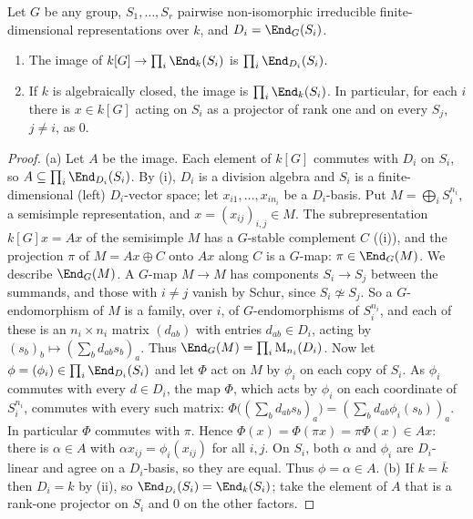 \begin{theorem}\label{thm:reps:burnside}
Let $G$ be any group, $S_1,\dots,S_r$ pairwise non-isomorphic irreducible finite-dimensional representations over $k$, and
$D_i=\End_G(S_i)$.
\begin{enumerate}[label=(\alph*)]
\item The image of $k[G]\to\prod_i\End_k(S_i)$ is $\prod_i\End_{D_i}(S_i)$.
\item If $k$ is algebraically closed, the image is $\prod_i\End_k(S_i)$. In particular, for each $i$ there is $x\in k[G]$ acting on $S_i$ as a
projector of rank one and on every $S_j$, $j\ne i$, as $0$.
\end{enumerate}
\end{theorem}

\begin{proof}
(a) Let $A$ be the image. Each element of $k[G]$ commutes with $D_i$ on $S_i$, so $A\subseteq\prod_i\End_{D_i}(S_i)$. By (i), $D_i$ is a
division algebra and $S_i$ is a finite-dimensional (left) $D_i$-vector space; let $x_{i1},\dots,x_{in_i}$ be a $D_i$-basis. Put
$M=\bigoplus_iS_i^{n_i}$, a semisimple representation, and $x=(x_{ij})_{i,j}\in M$. The subrepresentation $k[G]x=Ax$ of the semisimple $M$ has a $G$-stable complement $C$
((i)), and the projection $\pi$ of $M=Ax\oplus C$ onto $Ax$ along $C$ is a $G$-map: $\pi\in\End_G(M)$. We describe $\End_G(M)$. A
$G$-map $M\to M$ has components $S_i\to S_j$ between the summands, and those with $i\ne j$ vanish by Schur, since $S_i\not\simeq S_j$. So a
$G$-endomorphism of $M$ is a family, over $i$, of $G$-endomorphisms of $S_i^{n_i}$, and each of these is an $n_i\times n_i$ matrix $(d_{ab})$ with
entries $d_{ab}\in D_i$, acting by $(s_b)_b\mapsto(\sum_bd_{ab}s_b)_a$. Thus $\End_G(M)=\prod_i\mathrm M_{n_i}(D_i)$. Now let $\phi=(\phi_i)\in\prod_i\End_{D_i}(S_i)$ and let $\Phi$ act on
$M$ by $\phi_i$ on each copy of $S_i$. As $\phi_i$ commutes with every $d\in D_i$, the map $\Phi$, which acts by $\phi_i$ on each coordinate of $S_i^{n_i}$, commutes with every such matrix:
$\Phi\bigl((\sum_bd_{ab}s_b)_a\bigr)=(\sum_bd_{ab}\phi_i(s_b))_a$. In particular $\Phi$ commutes with
$\pi$. Hence $\Phi(x)=\Phi(\pi x)=\pi\Phi(x)\in Ax$: there is $\alpha\in A$ with $\alpha x_{ij}=\phi_i(x_{ij})$ for all $i,j$. On $S_i$, both $\alpha$ and $\phi_i$ are
$D_i$-linear and agree on a $D_i$-basis, so they are equal. Thus $\phi=\alpha\in A$.
(b) If $k=\bar k$ then $D_i=k$ by (ii), so $\End_{D_i}(S_i)=\End_k(S_i)$; take the element of $A$ that is a rank-one projector
on $S_i$ and $0$ on the other factors.
\end{proof}

